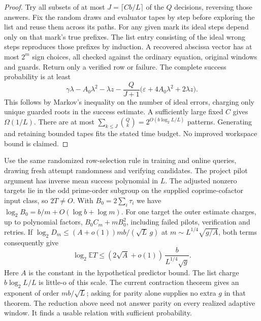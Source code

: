 \documentclass[11pt]{article}
\newcommand{\E}{\mathbb E}
\begin{document}
\begin{proof}
Try all subsets of at most $J=\lceil C b/L\rceil$ of the $Q$ decisions,
reversing those answers. Fix the random draws and evaluator tapes by
step before exploring the list and reuse them across its paths.
For any given mark its ideal steps depend only on that mark's true
prefixes. The list entry consisting of the ideal wrong steps reproduces
those prefixes by induction. A recovered abscissa vector has at most
$2^m$ sign choices, all checked against the ordinary equation, original
windows and guards. Return only a verified row or failure.
The complete success probability is at least
\[
 \gamma\lambda-A_0\lambda^2-\lambda z-
 \frac{Q}{J+1}\bigl(\varepsilon+4A_0\lambda^2+2\lambda z\bigr).
\]
This follows by Markov's inequality on the number of ideal errors,
charging only unique guarded roots in the success estimate. A sufficiently
large fixed $C$ gives $\Omega(1/L)$. There are at most
$\sum_{k\le J}\binom Qk=2^{O(b\log_2 L/L)}$ patterns.
Generating and retaining bounded tapes fits the stated time budget.
No improved workspace bound is claimed.
\end{proof}

Use the same randomized row-selection rule in training and online
queries, drawing fresh attempt randomness and verifying candidates.
The project pilot argument has inverse mean success polynomial in $L$.
The adjusted nonzero targets lie in the odd prime-order subgroup on the
supplied coprime-cofactor input class, so $2T\ne O$. With
$B_0=2\sum_i\tau_i$ we have $\log_2 B_0=b/m+O(\log b+\log m)$.
For one target the outer estimate charges, up to polynomial factors,
$B_0 C_m+mB_0^2$, including failed pilots, verification and retries.
If $\log_2 D_m\le(A+o(1))mb/(\sqrt L\,g)$ at
$m\sim L^{1/4}\sqrt{g/A}$, both terms consequently give
\[
 \log_2\E T\le (2\sqrt A+o(1))\,\frac{b}{L^{1/4}\sqrt g}.
\]
Here $A$ is the constant in the hypothetical predictor bound.
The list charge $b\log_2 L/L$ is little-o of this scale.
The current contraction theorem gives an exponent of order
$mb/\sqrt L$; asking for parity alone supplies no extra $g$ in that
theorem. The reduction above need not answer parity on every realized
adaptive window. It finds a usable relation with sufficient probability.
\end{document}
